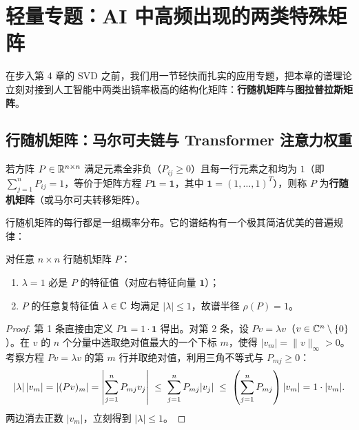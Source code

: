 \section{轻量专题：AI 中高频出现的两类特殊矩阵}
\label{sec:ch3-special-matrices}

在步入第 4 章的 SVD 之前，我们用一节轻快而扎实的应用专题，把本章的谱理论立刻对接到人工智能中两类出镜率极高的结构化矩阵：\textbf{行随机矩阵}与\textbf{图拉普拉斯矩阵}。

\subsection{行随机矩阵：马尔可夫链与 Transformer 注意力权重}

\begin{defBox}
\begin{definition}
\label{def:ch3-stochastic}
若方阵 $P \in \mathbb{R}^{n\times n}$ 满足元素全非负（$P_{ij} \ge 0$）且每一行元素之和均为 $1$（即 $\sum_{j=1}^n P_{ij} = 1$，等价于矩阵方程 $P\mathbf{1} = \mathbf{1}$，其中 $\mathbf{1} = (1,\dots,1)^T$），则称 $P$ 为\textbf{行随机矩阵}（或马尔可夫转移矩阵）。
\end{definition}
\end{defBox}

行随机矩阵的每行都是一组概率分布。它的谱结构有一个极其简洁优美的普遍规律：

\begin{thmBox}
\begin{proposition}[行随机矩阵的谱半径恒为 $1$]
\label{prop:ch3-stoch-spec}
对任意 $n\times n$ 行随机矩阵 $P$：
\begin{enumerate}
  \item $\lambda = 1$ 必是 $P$ 的特征值（对应右特征向量 $\mathbf{1}$）；
  \item $P$ 的任意复特征值 $\lambda \in \mathbb{C}$ 均满足 $|\lambda| \le 1$，故谱半径 $\rho(P) = 1$。
\end{enumerate}
\end{proposition}
\end{thmBox}

\begin{proof}
第 1 条直接由定义 $P\mathbf{1} = 1\cdot\mathbf{1}$ 得出。对第 2 条，设 $Pv = \lambda v$（$v \in \mathbb{C}^n \setminus \{0\}$）。在 $v$ 的 $n$ 个分量中选取绝对值最大的一个下标 $m$，使得 $|v_m| = \|v\|_\infty > 0$。考察方程 $Pv = \lambda v$ 的第 $m$ 行并取绝对值，利用三角不等式与 $P_{mj} \ge 0$：
\[
  |\lambda|\,|v_m| = \left|(Pv)_m\right| = \left|\sum_{j=1}^n P_{mj} v_j\right|
  \;\le\; \sum_{j=1}^n P_{mj} |v_j|
  \;\le\; \left(\sum_{j=1}^n P_{mj}\right)|v_m| = 1\cdot |v_m|.
\]
两边消去正数 $|v_m|$，立刻得到 $|\lambda| \le 1$。
\end{proof}

